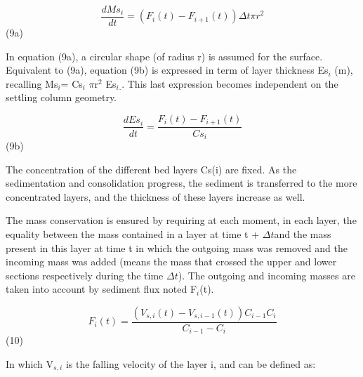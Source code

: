 \begin{equation*}
\dfrac{dMs_{i} }{dt} =(F_{i} (t)-F_{i+1} (t))\Delta t\pi r^{2} 
\end{equation*}%
\hspace{5mm} \hspace{5mm} \hspace{5mm} \hspace{5mm} (9a)

In equation (9a), a circular shape (of radius r) is assumed for the surface.
Equivalent to (9a), equation (9b) is expressed in term of layer thickness Es$%
_{i}$ (m), recalling Ms$_{i}$= Cs$_{i}$ $\pi$r$^{2}$ Es$_{i}$$_{.}$. This
last expression becomes independent on the settling column geometry.

\begin{equation*}
\dfrac{dEs_{i} }{dt} =\dfrac{F_{i} (t)-F_{i+1} (t)}{Cs_{i} } 
\end{equation*}%
\hspace{5mm} \hspace{5mm} \hspace{5mm} \hspace{5mm} \hspace{5mm} (9b)

The concentration of the different bed layers Cs(i) are fixed. As the
sedimentation and consolidation progress, the sediment is transferred to the
more concentrated layers, and the thickness of these layers increase as well.

The mass conservation is ensured by requiring at each moment, in each layer, the
equality between the mass contained in a layer at time t + $\Delta t$and the
mass present in this layer at time t in which the outgoing mass was removed
and the incoming mass was added (means the mass that crossed the upper and
lower sections respectively during the time $\Delta t$). The outgoing and
incoming masses are taken into account by sediment flux noted F$_{i}$(t).

\begin{equation*}
F_{i} (t)=\dfrac{(V_{s,i} (t)-V_{s,i-1} (t))C_{i-1} C_{i} }{C_{i-1} -C_{i} } 
\end{equation*}%
\hspace{5mm} \hspace{5mm} \hspace{5mm} \hspace{5mm} \hspace{5mm} (10)

In which V$_{s,i}$ is the falling velocity of the layer i, and can be
defined as:

